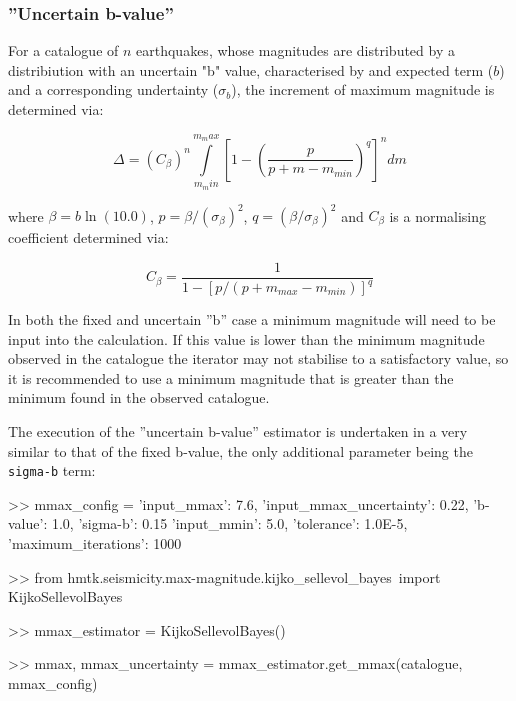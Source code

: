 \subsubsection{''Uncertain b-value''}

For a catalogue of $n$ earthquakes, whose magnitudes are distributed by a \textcite{GutenbergRichter1944} distribiution with an uncertain "b" value, characterised by and expected term ($b$) and a corresponding undertainty ($\sigma_b$), the increment of maximum magnitude is determined via:


\begin{equation}
\Delta = \left( {C_{\beta}} \right)^n \int\limits_{m_min}^{m_max} \left[ {1 - \left( {\frac{p}{p + m - m_{min}}} \right) ^q} \right]^n dm
\end{equation}

where $\beta = b \ln \left( {10.0} \right)$, $p = \beta / \left( {\sigma_{\beta}} \right) ^ 2$, $q = \left( {\beta / \sigma_{\beta}} \right) ^ 2$ and $C_{\beta}$ is a normalising coefficient determined via:

\begin{equation}
C_{\beta} = \frac{1}{1 - \left[ {p / \left( {p + m_{max} - m_{min}} \right) } \right]^q}
\end{equation}

In both the fixed and uncertain ''b'' case a minimum magnitude will need to be input into the calculation. If this value is lower than the minimum magnitude observed in the catalogue the iterator may not stabilise to a satisfactory value, so it is recommended to use a minimum magnitude that is greater than the minimum found in the observed catalogue.

The execution of the ''uncertain b-value'' estimator is undertaken in a very similar to that of the fixed b-value, the only additional parameter being the \verb=sigma-b= term:

\begin{python}[frame=single]
>> mmax_config = {'input_mmax': 7.6,
                  'input_mmax_uncertainty': 0.22,
                  'b-value': 1.0,
                  'sigma-b': 0.15
                  'input_mmin': 5.0,
                  'tolerance': 1.0E-5, 
                  'maximum_iterations': 1000}
                       
>> from hmtk.seismicity.max-magnitude.kijko_sellevol_bayes\
    import KijkoSellevolBayes

>> mmax_estimator = KijkoSellevolBayes()

>> mmax, mmax_uncertainty = mmax_estimator.get_mmax(catalogue,
                                                    mmax_config)
\end{python}

